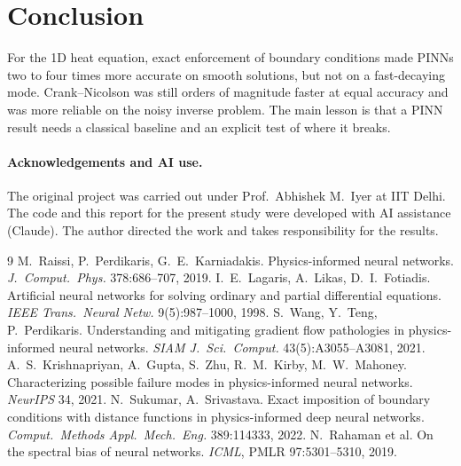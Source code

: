 \documentclass[10pt,a4paper]{article}
\begin{document}
\section{Conclusion}
For the 1D heat equation, exact enforcement of boundary conditions made PINNs two to four times more accurate on smooth solutions, but not on a fast-decaying mode. Crank--Nicolson was still orders of magnitude faster at equal accuracy and was more reliable on the noisy inverse problem. The main lesson is that a PINN result needs a classical baseline and an explicit test of where it breaks.

\paragraph{Acknowledgements and AI use.} The original project was carried out under Prof.\ Abhishek M.\ Iyer at IIT Delhi. The code and this report for the present study were developed with AI assistance (Claude). The author directed the work and takes responsibility for the results.

\begin{thebibliography}{9}\small\setlength{\itemsep}{0pt}
 M.~Raissi, P.~Perdikaris, G.~E.~Karniadakis. Physics-informed neural networks. \emph{J.\ Comput.\ Phys.} 378:686--707, 2019.
 I.~E.~Lagaris, A.~Likas, D.~I.~Fotiadis. Artificial neural networks for solving ordinary and partial differential equations. \emph{IEEE Trans.\ Neural Netw.} 9(5):987--1000, 1998.
 S.~Wang, Y.~Teng, P.~Perdikaris. Understanding and mitigating gradient flow pathologies in physics-informed neural networks. \emph{SIAM J.\ Sci.\ Comput.} 43(5):A3055--A3081, 2021.
 A.~S.~Krishnapriyan, A.~Gupta, S.~Zhu, R.~M.~Kirby, M.~W.~Mahoney. Characterizing possible failure modes in physics-informed neural networks. \emph{NeurIPS} 34, 2021.
 N.~Sukumar, A.~Srivastava. Exact imposition of boundary conditions with distance functions in physics-informed deep neural networks. \emph{Comput.\ Methods Appl.\ Mech.\ Eng.} 389:114333, 2022.
 N.~Rahaman et al. On the spectral bias of neural networks. \emph{ICML}, PMLR 97:5301--5310, 2019.
\end{thebibliography}
\end{document}
